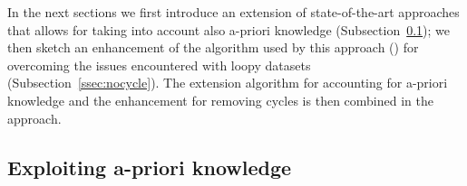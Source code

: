 


In the next sections we first introduce an extension of state-of-the-art approaches that allows for taking into account also a-priori knowledge (Subsection~\ref{ssec:apriori}); we then sketch an enhancement of the algorithm used by this approach (\nocycle) for overcoming the issues encountered with loopy datasets (Subsection~\ref{ssec:nocycle}). The extension algorithm for accounting for a-priori knowledge and the enhancement for removing cycles is then combined in the \protrack approach.



   


\subsection{Exploiting a-priori knowledge}
\label{ssec:apriori}


